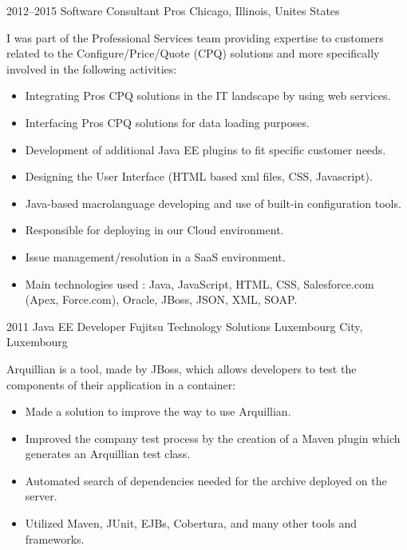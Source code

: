 \documentclass[]{friggeri-cv} %
\begin{document}
\begin{entrylist}

\entry
{2012--2015}
{Software Consultant} 
{Pros}
{Chicago, Illinois, Unites States}
{I was part of the Professional Services team providing expertise to customers related to the
Configure/Price/Quote (CPQ) solutions and more specifically involved in the following activities:\\

\vspace{-4mm}
\begin{itemize}
	\item Integrating Pros CPQ solutions in the IT landscape by using web services.
	\item Interfacing Pros CPQ solutions for data loading purposes.
	\item Development of additional Java EE plugins to fit specific customer needs.
    \item Designing the User Interface (HTML based xml files, CSS, Javascript).
    \item Java-based macrolanguage developing and use of built-in configuration tools.
    \item Responsible for deploying in our Cloud environment.
    \item Issue management/resolution in a SaaS environment.
    \item Main technologies used : Java, JavaScript, HTML, CSS, Salesforce.com (Apex, Force.com),
Oracle, JBoss, JSON, XML, SOAP.
\end{itemize}}
\vspace{-7mm}

\end{entrylist}


\begin{entrylist}

\entry
{2011}
{Java EE Developer} 
{Fujitsu Technology Solutions}
{Luxembourg City, Luxembourg}
{Arquillian is a tool, made by JBoss, which allows developers to test the components of their
application in a container:\\

\vspace{-4mm}
\begin{itemize}
	\item Made a solution to improve the way to use Arquillian.
	\item Improved the company test process by the creation of a Maven plugin which generates an Arquillian test class.
	\item Automated search of dependencies needed for the archive deployed on the server.
    \item Utilized Maven, JUnit, EJBs, Cobertura, and many other tools and frameworks.
\end{itemize}}
\vspace{-7mm}

\end{entrylist}
\end{document}
